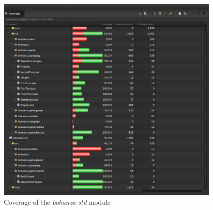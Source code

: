 \begin{figure}[h!]
    \includegraphics[width=\textwidth]{../img/coverage-std}
    \caption{Coverage of the \emph{bohanza-std} module}
    \label{fig:test:coverage-std}
\end{figure}
